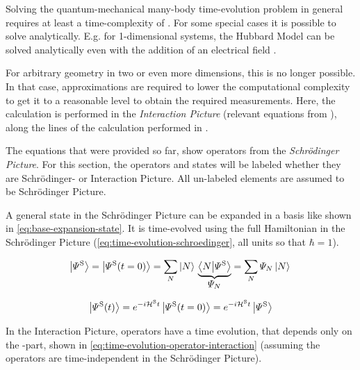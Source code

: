 Solving the quantum-mechanical many-body time-evolution problem in general requires at least a time-complexity of .
For some special cases it is possible to solve analytically.
E.g. for 1-dimensional systems, the Hubbard Model can be solved analytically even with the addition of an electrical field \cite{exactSolutionExampleHubbardEvenElectricalField}.

For arbitrary geometry in two or even more dimensions, this is no longer possible.
In that case, approximations are required to lower the computational complexity to get it to a reasonable level to obtain the required measurements.
Here, the calculation is performed in the \emph{Interaction Picture} (relevant equations from \cite{schwablBook}), along the lines of the calculation performed in \cite{variationalClassicalNetworksPaper}.

The equations that were provided so far, show operators from the \emph{Schrödinger Picture}. 
For this section, the operators and states will be labeled whether they are Schrödinger- or Interaction Picture. All un-labeled elements are assumed to be Schrödinger Picture.

A general state in the Schrödinger Picture can be expanded in a basis like shown in \autoref{eq:base-expansion-state}. It is time-evolved using the full Hamiltonian in the Schrödinger Picture (\autoref{eq:time-evolution-schroedinger}, all units so that $\hbar = 1$).

\begin{equation}
    \label{eq:base-expansion-state}
    \ketpsi[\schroedingerPicture]{} = \ketpsiof[\schroedingerPicture]{t=0} = 
    \lsum[N] \ketN{}\underbrace{\braketHelper{N}{\picturePsi[\schroedingerPicture]{}}}_{\text{\normalsize\psiN}} = \lsum[N] \psiN \ketN{}
\end{equation}

\begin{equation}
    \label{eq:time-evolution-schroedinger}
    \ketpsiof[\schroedingerPicture]{t} = e^{-i \pictureHamiltonian[\schroedingerPicture] t} \ketpsiof[\schroedingerPicture]{t=0} = e^{-i \pictureHamiltonian[\schroedingerPicture] t} \ketpsi[\schroedingerPicture]{}
\end{equation}

In the Interaction Picture, operators have a time evolution, that depends only on the \HzeroHamiltonian[\schroedingerPicture]{}-part, shown in \autoref{eq:time-evolution-operator-interaction} (assuming the operators are time-independent in the Schrödinger Picture). 


